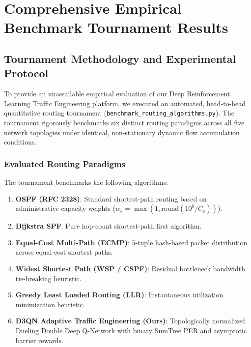 \chapter{Comprehensive Empirical Benchmark Tournament Results}
\label{chap:results}

\section{Tournament Methodology and Experimental Protocol}
To provide an unassailable empirical evaluation of our Deep Reinforcement Learning Traffic Engineering platform, we executed an automated, head-to-head quantitative routing tournament (\texttt{benchmark\_routing\_algorithms.py}). The tournament rigorously benchmarks six distinct routing paradigms across all five network topologies under identical, non-stationary dynamic flow accumulation conditions.

\subsection{Evaluated Routing Paradigms}
The tournament benchmarks the following algorithms:
\begin{enumerate}
    \item \textbf{OSPF (RFC 2328)}: Standard shortest-path routing based on administrative capacity weights ($w_e = \max(1, \text{round}(10^8 / C_e))$).
    \item \textbf{Dijkstra SPF}: Pure hop-count shortest-path first algorithm.
    \item \textbf{Equal-Cost Multi-Path (ECMP)}: 5-tuple hash-based packet distribution across equal-cost shortest paths.
    \item \textbf{Widest Shortest Path (WSP / CSPF)}: Residual bottleneck bandwidth tie-breaking heuristic.
    \item \textbf{Greedy Least Loaded Routing (LLR)}: Instantaneous utilization minimization heuristic.
    \item \textbf{D3QN Adaptive Traffic Engineering (Ours)}: Topologically normalized Dueling Double Deep Q-Network with binary SumTree PER and asymptotic barrier rewards.
\end{enumerate}

